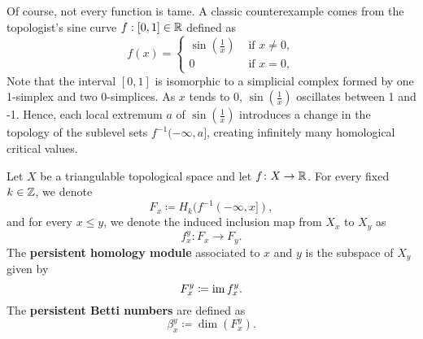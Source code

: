 \begin{example}
    Of course, not every function is tame. A classic counterexample comes from the topologist's sine curve $ f: [0, 1] \in \mathbb R $ defined as
    \begin{equation}
        f(x) = \begin{cases}
            \sin(\frac{1}{x}) &\text{ if } x \neq 0, \\
            0 &\text{ if } x = 0,
        \end{cases}
    \end{equation}
    Note that the interval $ [0, 1] $ is isomorphic to a simplicial complex formed by one 1-simplex and two 0-simplices. As $ x $ tends to $ 0 $, $ \sin(\frac{1}{x}) $ oscillates between 1 and -1. Hence, each local extremum $ a $ of $ \sin(\frac{1}{x}) $ introduces a change in the topology of the sublevel sets $ f^{-1}(-\infty, a] $, creating infinitely many homological critical values.
\end{example}

\begin{definition} \label{def:persistent-homology}
    Let $X$ be a triangulable topological space and let $ f \colon X \to \mathbb R $. For every fixed $ k \in \mathbb Z $, we denote
    \begin{equation}
        F_x \coloneq H_k(f^{-1}(-\infty, x]),
    \end{equation}
    and for every $ x \leq y $, we denote the induced inclusion map from $ X_x $ to $ X_y $ as
    \begin{equation}
        f_x^y \colon F_x \to F_y.
    \end{equation}
    The {\bf persistent homology module} associated to $ x $ and $ y $ is the subspace of $X_y$ given by 
    \begin{equation}
        F_x^y \coloneq \operatorname{im} f_x^y.
    \end{equation}
    The {\bf persistent Betti numbers} are defined as
    \begin{equation}
        \beta_x^y \coloneq \dim(F_x^y).
    \end{equation}
\end{definition}

